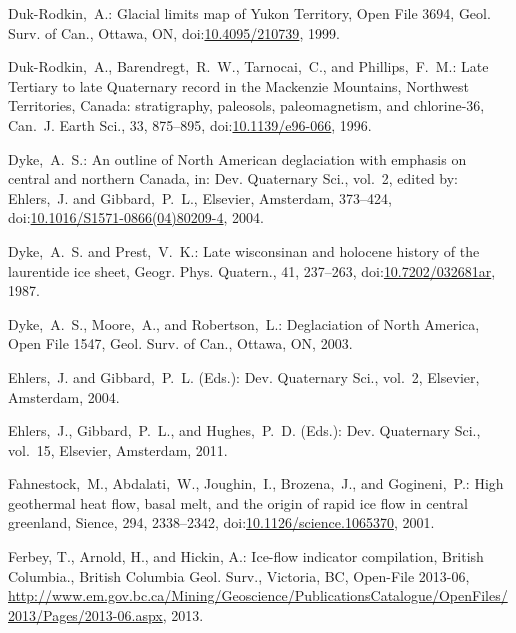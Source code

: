 \documentclass[tc, manuscript]{copernicus}
\begin{document}
\begin{thebibliography}{114}
Duk-Rodkin,~A.: Glacial limits map of Yukon Territory, Open File 3694, Geol. Surv. of Can., Ottawa, ON,
doi:\href{http://dx.doi.org/10.4095/210739}{10.4095/210739}, 1999.


Duk-Rodkin,~A., Barendregt,~R.~W., Tarnocai,~C., and Phillips,~F.~M.: Late Tertiary to late Quaternary record in the Mackenzie Mountains, Northwest Territories, Canada: stratigraphy, paleosols, paleomagnetism, and chlorine-36, Can.~J. Earth Sci., 33, 875--895,
doi:\href{http://dx.doi.org/10.1139/e96-066}{10.1139/e96-066}, 1996.


Dyke,~A.~S.: An outline of North American deglaciation with emphasis
on central and northern Canada, in: Dev. Quaternary Sci., vol.~2,
edited by: Ehlers,~J. and Gibbard,~P.~L., Elsevier, Amsterdam, 373--424,
doi:\href{http://dx.doi.org/10.1016/S1571-0866(04)80209-4}{10.1016/S1571-0866(04)80209-4}, 2004.


Dyke,~A.~S. and Prest,~V.~K.: Late wisconsinan and holocene history of the laurentide ice sheet, G{e}ogr. Phys. Quatern., 41, 237--263,
doi:\href{http://dx.doi.org/10.7202/032681ar}{10.7202/032681ar}, 1987.


Dyke,~A.~S., Moore,~A., and Robertson,~L.: Deglaciation of North America, Open File 1547, Geol. Surv. of Can., Ottawa, ON, 2003.


Ehlers,~J. and Gibbard,~P.~L. (Eds.): Dev. Quaternary Sci., vol.~2, Elsevier, Amsterdam, 2004.


Ehlers,~J., Gibbard,~P.~L., and Hughes,~P.~D. (Eds.):  Dev. Quaternary
Sci., vol.~15, Elsevier, Amsterdam, 2011.


Fahnestock,~M., Abdalati,~W., Joughin,~I., Brozena,~J., and Gogineni,~P.: High geothermal heat flow, basal melt, and the origin of rapid ice flow in central greenland, Sience, 294, 2338--2342,
doi:\href{http://dx.doi.org/10.1126/science.1065370}{10.1126/science.1065370}, 2001.


Ferbey, T., Arnold, H., and Hickin, A.: Ice-flow indicator compilation, British Columbia., British Columbia Geol. Surv., Victoria, BC, Open-File 2013-06,
\urlprefix\url{http://www.em.gov.bc.ca/Mining/Geoscience/PublicationsCatalogue/OpenFiles/2013/Pages/2013-06.aspx}, 2013.



\end{thebibliography}
\end{document}

